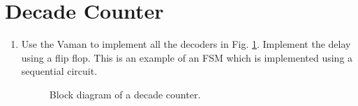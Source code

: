 \documentclass[journal,12pt,twocolumn]{IEEEtran}
\renewcommand\thesection{\arabic{section}}
\begin{document}
\section{Decade Counter }
\renewcommand{\theequation}{\theenumi}
\renewcommand{\thefigure}{\theenumi}
\begin{enumerate}[label=\thesection.\arabic*.,ref=\thesection.\theenumi]

\item Use the Vaman to implement all the decoders in Fig.  \ref{fig:vaman_decade_counter}.  Implement the delay using a flip flop.  This is an 
example of an FSM which is implemented using a sequential circuit.

\begin{figure}[!ht]
\centering
\resizebox{\columnwidth}{!}{

}
\caption{Block diagram of a decade counter.}
\label{fig:vaman_decade_counter}
\end{figure}


\end{enumerate}
%
\end{document}
